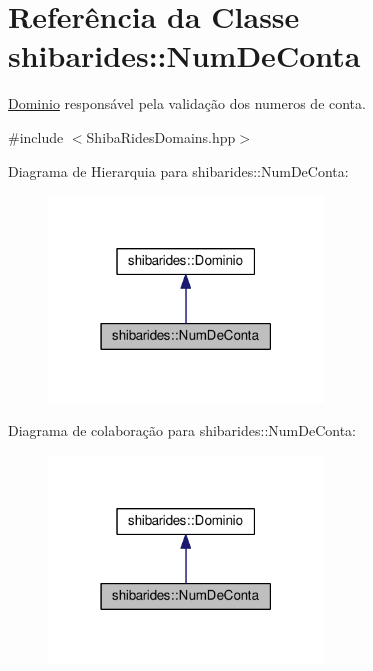 \hypertarget{classshibarides_1_1NumDeConta}{}\section{Referência da Classe shibarides\+:\+:Num\+De\+Conta}
\label{classshibarides_1_1NumDeConta}


\hyperlink{classshibarides_1_1Dominio}{Dominio} responsável pela validação dos numeros de conta.  




{\ttfamily \#include $<$Shiba\+Rides\+Domains.\+hpp$>$}



Diagrama de Hierarquia para shibarides\+:\+:Num\+De\+Conta\+:\nopagebreak
\begin{figure}[H]
\begin{center}
\leavevmode
\includegraphics[width=207pt]{classshibarides_1_1NumDeConta__inherit__graph}
\end{center}
\end{figure}


Diagrama de colaboração para shibarides\+:\+:Num\+De\+Conta\+:\nopagebreak
\begin{figure}[H]
\begin{center}
\leavevmode
\includegraphics[width=207pt]{classshibarides_1_1NumDeConta__coll__graph}
\end{center}
\end{figure}
